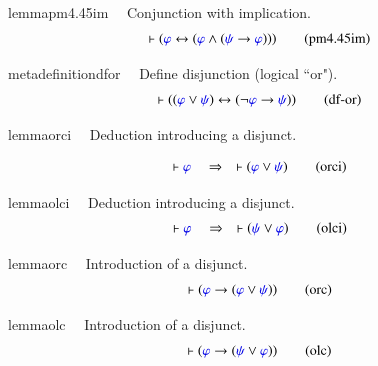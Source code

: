 \begin{restatable}{lemma}{pm4.45im}~~ Conjunction with implication.  
\begin{align}
\vdash ( \mw{\varphi} \leftrightarrow ( \mw{\varphi} \wedge ( \mw{\psi}
    \rightarrow \mw{\varphi} ) ) )\label{eq:pm4.45im}\tag{pm4.45im}
\end{align}
\end{restatable}

\begin{restatable}{metadefinition}{dfor}~~ Define disjunction (logical ``or"). 
\begin{align}
\vdash ( ( \mw{\varphi} \vee \mw{\psi} ) \leftrightarrow ( \lnot \mw{\varphi}
    \rightarrow \mw{\psi} ) )\label{eq:df-or}\tag{df-or}
\end{align}
\end{restatable}

\begin{restatable}{lemma}{orci}~~ Deduction introducing a disjunct. 

\begin{align}
\vdash \mw{\varphi}\quad\Rightarrow\quad \vdash ( \mw{\varphi} \vee \mw{\psi}
    )\label{eq:orci}\tag{orci}
\end{align}
\end{restatable}

\begin{restatable}{lemma}{olci}~~ Deduction introducing a disjunct. 
\begin{align}
\vdash \mw{\varphi}\quad\Rightarrow\quad \vdash ( \mw{\psi} \vee \mw{\varphi}
    )\label{eq:olci}\tag{olci}
\end{align}
\end{restatable}

\begin{restatable}{lemma}{orc}~~ Introduction of a disjunct. 
\begin{align}
\vdash ( \mw{\varphi} \rightarrow ( \mw{\varphi} \vee \mw{\psi} )
    )\label{eq:orc}\tag{orc}
\end{align}
\end{restatable}

\begin{restatable}{lemma}{olc}~~ Introduction of a disjunct.  
\begin{align}
\vdash ( \mw{\varphi} \rightarrow ( \mw{\psi} \vee \mw{\varphi} )
    )\label{eq:olc}\tag{olc}
\end{align}
\end{restatable}

